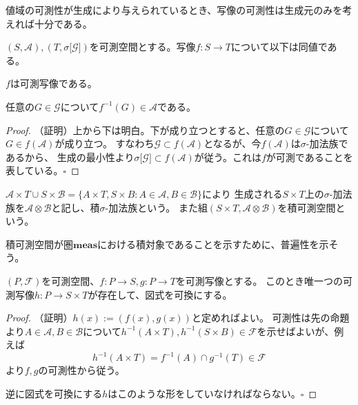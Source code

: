 \documentclass[../root.tex]{subfiles}
\begin{document}
値域の可測性が生成により与えられているとき、写像の可測性は生成元のみを考えれば十分である。

\begin{Prop}{}{}
$ ( S, \mathscr{A} ), ( T, \sigma\lbrack \mathscr{G} \rbrack ) $を可測空間とする。写像$ f\colon S\rightarrow T $について以下は同値である。
\begin{EnumEquiv}
\item $ f $は可測写像である。
\item 任意の$ G\in\mathscr{G} $について$ f^{-1}( G )\in\mathscr{A} $である。
\end{EnumEquiv}
\end{Prop}

\begin{proof}
（証明）上から下は明白。下が成り立つとすると、任意の$ G\in\mathscr{G} $について$ G\in f( \mathscr{A} ) $が成り立つ。
すなわち$ \mathscr{G}\subset f( \mathscr{A} ) $となるが、今$ f( \mathscr{A} ) $は$ \sigma $-加法族であるから、
生成の最小性より$ \sigma\lbrack \mathscr{G} \rbrack\subset f( \mathscr{A} ) $が従う。これは$ f $が可測であることを表している。$ \square $
\end{proof}

\begin{Def}{}{}
$ \mathscr{A}\times T\cup S\times\mathscr{B}=\lbrace A\times T, S\times B : A\in\mathscr{A}, B\in\mathscr{B} \rbrace $により
生成される$ S\times T $上の$ \sigma $-加法族を$ \mathscr{A}\otimes\mathscr{B} $と記し、積$ \sigma $-加法族という。
また組$ ( S\times T, \mathscr{A}\otimes\mathscr{B} ) $を積可測空間という。
\end{Def}

積可測空間が圏$ \mathbf{meas} $における積対象であることを示すために、普遍性を示そう。

\begin{Prop}{}{}
$ ( P, \mathscr{F} ) $を可測空間、$ f\colon P\rightarrow S, g\colon P\rightarrow T $を可測写像とする。
このとき唯一つの可測写像$ h\colon P\rightarrow S\times T $が存在して、図式を可換にする。
\end{Prop}

\begin{proof}
（証明）$ h( x ):=( f( x ), g( x ) ) $と定めればよい。
可測性は先の命題より$ A\in\mathscr{A}, B\in\mathscr{B} $について$ h^{-1}( A\times T ), h^{-1}( S\times B )\in\mathscr{F} $を示せばよいが、例えば
\[ h^{-1}( A\times T )=f^{-1}( A )\cap g^{-1}( T )\in\mathscr{F} \]
より$ f, g $の可測性から従う。

逆に図式を可換にする$ h $はこのような形をしていなければならない。$ \square $
\end{proof}
\end{document}
